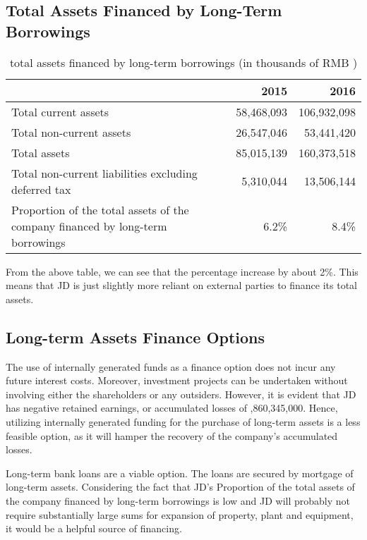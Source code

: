 \subsection{Total Assets Financed by Long-Term Borrowings}


\begin{table}[H]	
	\begin{center}
		\begin{tabular}{p{8.3cm}rr}
			\toprule
			&\textbf{2015}&\textbf{2016}\\
			\midrule
			Total current assets&	58,468,093&	106,932,098\\
			Total non-current assets &	26,547,046&	53,441,420\\
			Total assets &	85,015,139&	160,373,518\\
			Total non-current liabilities excluding deferred tax &	5,310,044&	13,506,144\\
			Proportion of the total assets of the company financed by long-term borrowings	&6.2\%&	8.4\%\\
			\bottomrule
		\end{tabular}
	\end{center}
	\caption{total assets financed by long-term borrowings (in thousands of RMB \textyen)}\label{table:1}
\end{table}

From the above table, we can see that the percentage increase by about 2\%. This means that JD is just slightly more reliant on external parties to finance its total assets. 

\subsection{Long-term Assets Finance Options}
The use of internally generated funds as a finance option does not incur any future interest costs. Moreover, investment projects can be undertaken without involving either the shareholders or any outsiders. However, it is evident that JD has negative retained earnings, or accumulated losses of ,860,345,000. Hence, utilizing internally generated funding for the purchase of long-term assets is a less feasible option, as it will hamper the recovery of the company’s accumulated losses. 

Long-term bank loans are a viable option. The loans are secured by mortgage of long-term assets. Considering the fact that JD’s Proportion of the total assets of the company financed by long-term borrowings is low and JD will probably not require substantially large sums for expansion of property, plant and equipment, it would be a helpful source of financing.  

